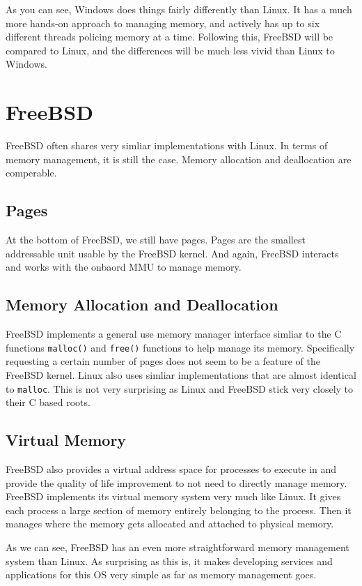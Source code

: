 \documentclass[10pt,letterpaper,onecolumn,draftclsnofoot]{IEEEtran}
\begin{document}
	As you can see, Windows does things fairly differently than Linux. It has a much
	more hands-on approach to managing memory, and actively has up to six different
	threads policing memory at a time. Following this, FreeBSD will be compared to
	Linux, and the differences will be much less vivid than Linux to Windows.

  \section{FreeBSD}
  FreeBSD often shares very simliar implementations with Linux. In terms of memory
  management, it is still the case. Memory allocation and deallocation are comperable. 

  \subsection{Pages}
  At the bottom of FreeBSD, we still have pages. Pages are the smallest addressable
  unit usable by the FreeBSD kernel. And again, FreeBSD interacts and works with the 
  onbaord MMU to manage memory. 

  \subsection{Memory Allocation and Deallocation}
  FreeBSD implements a general use memory manager interface simliar to the C 
  functions \texttt{malloc()} and 
  \texttt{free()} functions to help manage its memory. Specifically requesting 
  a certain number of pages does not seem to be a feature of the FreeBSD kernel.
  Linux also uses simliar implementations that are almost identical to \texttt{malloc}.
  This is not very surprising as Linux and FreeBSD stick very closely to their C
  based roots. \cite{freebsd2016}
 
  \subsection{Virtual Memory}
	FreeBSD also provides a virtual address space for processes to execute in
	and provide the quality of life improvement to not need to directly manage
	memory. FreeBSD implements its virtual memory system very much like Linux.
	It gives each process a large section of memory entirely belonging to the
	process. Then it manages where the memory gets allocated and attached to
	physical memory.

  As we can see, FreeBSD has an even more straightforward memory management system
  than Linux. As surprising as this is, it makes developing services and applications
  for this OS very simple as far as memory management goes.
  
\end{document}
